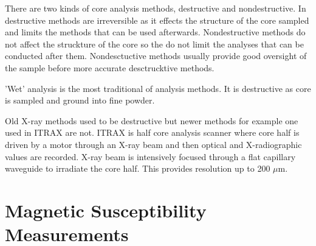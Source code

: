 \documentclass[12pt,a4paper,oneside,pdftex]{report}
\begin{document}
There are two kinds of core analysis methods, destructive and nondestructive. In destructive methods
are irreversible as it effects the structure of the core sampled and limits the methods that can be used
afterwards. Nondestructive methods do not affect the struckture of the core so the do not limit the 
analyses that can be conducted after them. Nondesctuctive methods usually provide good oversight of the
sample before more accurate desctrucktive methods.

'Wet' analysis is the most traditional of analysis methods. It is destructive as core is sampled and 
ground into fine powder. %

Old X-ray methods used to be destructive \cite{Croudace2006} but newer methods for 
example one used in ITRAX \cite{Croudace2006} are not. ITRAX is half core analysis scanner where core half is 
driven by a motor through an X-ray beam and then optical and X-radiographic values are recorded. 
X-ray beam is intensively focused through a flat capillary waveguide to irradiate the core half. 
This provides resolution up to 200 $\mu$m.%


\section{Magnetic Susceptibility Measurements}
\end{document}
